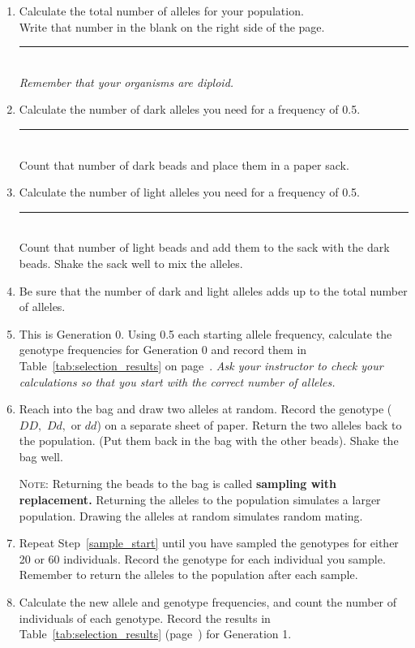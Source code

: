 \documentclass[12pt]{exam}
\newcommand{\allele}[1]{$#1$}
\begin{document}
\begin{enumerate}[resume]
	
	\item Calculate the total number of alleles for your population.\\
	Write that number in the blank on the right side of the page. 
	\hfill \rule{0.5in}{0.4pt}\\ \emph{Remember that your
		organisms are diploid.} 
	
	\item Calculate the number of dark alleles you need for a frequency of 0.5. 
	\hfill \rule{0.5in}{0.4pt} \\ Count that number of dark beads and place 
	them in a paper sack. 
	
	\item Calculate the number of light alleles you need for a frequency of 0.5.
	\hfill \rule{0.5in}{0.4pt} \\ Count that number of light beads and add 
	them to the sack with the dark beads. Shake the sack well to mix the alleles.
	
	\item Be sure that the number of dark and light alleles adds up to the 
	total number of alleles.
	
	\item This is Generation 0. Using 0.5 each starting allele frequency, 
	calculate the genotype frequencies for Generation 0 and record them in 
	Table~\ref{tab:selection_results} on page~\pageref{tab:selection_results}. 
	\emph{Ask your instructor to check your calculations so that you start with 
		the correct number of alleles.}
	
	\item \label{sample_start} Reach into the bag and draw two alleles 
	at random. Record the genotype (\allele{DD,} \allele{Dd,} or \allele{dd}) on 
	a separate sheet of paper. Return the two alleles back to the population. 
	(Put them back in the bag with the other beads). Shake the bag well.
	
	\textsc{Note:} Returning the beads to the bag is called \textbf{sampling with replacement.} 
	Returning the alleles to the population simulates a larger population. Drawing 
	the alleles at random simulates random mating.
	
	\item Repeat Step~\ref{sample_start} until you have sampled the genotypes 
	for either 20 or 60 individuals. Record the genotype for each individual you sample. 
	Remember to return the alleles to the population after each sample. 
	
	\item Calculate the new allele and genotype frequencies, and count the number
	of individuals of each genotype. Record the results in Table~\ref{tab:selection_results} (page~\pageref{tab:selection_results}) 
	for Generation 1. 
	
\end{enumerate}
\end{document}
